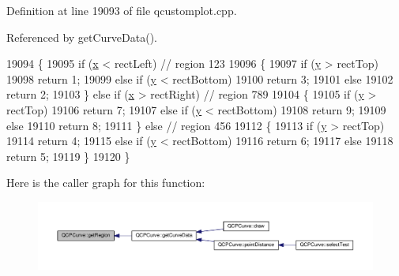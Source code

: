 Definition at line 19093 of file qcustomplot.\+cpp.



Referenced by get\+Curve\+Data().


\begin{DoxyCode}
19094                                                                    \{
19095   \textcolor{keywordflow}{if} (\hyperlink{_comparision_pictures_2_createtest_image_8m_a9336ebf25087d91c818ee6e9ec29f8c1}{x} < rectLeft) \textcolor{comment}{// region 123}
19096   \{
19097     \textcolor{keywordflow}{if} (\hyperlink{_comparision_pictures_2_createtest_image_8m_a2fb1c5cf58867b5bbc9a1b145a86f3a0}{y} > rectTop)
19098       \textcolor{keywordflow}{return} 1;
19099     \textcolor{keywordflow}{else} \textcolor{keywordflow}{if} (\hyperlink{_comparision_pictures_2_createtest_image_8m_a2fb1c5cf58867b5bbc9a1b145a86f3a0}{y} < rectBottom)
19100       \textcolor{keywordflow}{return} 3;
19101     \textcolor{keywordflow}{else}
19102       \textcolor{keywordflow}{return} 2;
19103   \} \textcolor{keywordflow}{else} \textcolor{keywordflow}{if} (\hyperlink{_comparision_pictures_2_createtest_image_8m_a9336ebf25087d91c818ee6e9ec29f8c1}{x} > rectRight) \textcolor{comment}{// region 789}
19104   \{
19105     \textcolor{keywordflow}{if} (\hyperlink{_comparision_pictures_2_createtest_image_8m_a2fb1c5cf58867b5bbc9a1b145a86f3a0}{y} > rectTop)
19106       \textcolor{keywordflow}{return} 7;
19107     \textcolor{keywordflow}{else} \textcolor{keywordflow}{if} (\hyperlink{_comparision_pictures_2_createtest_image_8m_a2fb1c5cf58867b5bbc9a1b145a86f3a0}{y} < rectBottom)
19108       \textcolor{keywordflow}{return} 9;
19109     \textcolor{keywordflow}{else}
19110       \textcolor{keywordflow}{return} 8;
19111   \} \textcolor{keywordflow}{else} \textcolor{comment}{// region 456}
19112   \{
19113     \textcolor{keywordflow}{if} (\hyperlink{_comparision_pictures_2_createtest_image_8m_a2fb1c5cf58867b5bbc9a1b145a86f3a0}{y} > rectTop)
19114       \textcolor{keywordflow}{return} 4;
19115     \textcolor{keywordflow}{else} \textcolor{keywordflow}{if} (\hyperlink{_comparision_pictures_2_createtest_image_8m_a2fb1c5cf58867b5bbc9a1b145a86f3a0}{y} < rectBottom)
19116       \textcolor{keywordflow}{return} 6;
19117     \textcolor{keywordflow}{else}
19118       \textcolor{keywordflow}{return} 5;
19119   \}
19120 \}
\end{DoxyCode}


Here is the caller graph for this function\+:\nopagebreak
\begin{figure}[H]
\begin{center}
\leavevmode
\includegraphics[width=350pt]{class_q_c_p_curve_a3af3183f35bd7aebe149f29ae4f1034a_icgraph}
\end{center}
\end{figure}


